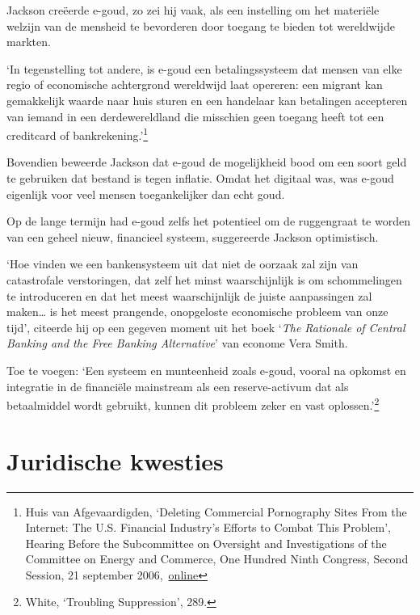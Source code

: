 \documentclass[
  a5paper,
  smalldemyvopaper,11pt,twoside,onecolumn,openright,extrafontsizes]{memoir}
\begin{document}
Jackson creëerde e-goud, zo zei hij vaak, als een instelling om het
materiële welzijn van de mensheid te bevorderen door toegang te bieden
tot wereldwijde markten.

`In tegenstelling tot andere, is e-goud een betalingssysteem dat mensen
van elke regio of economische achtergrond wereldwijd laat opereren: een
migrant kan gemakkelijk waarde naar huis sturen en een handelaar kan
betalingen accepteren van iemand in een derdewereldland die misschien
geen toegang heeft tot een creditcard of bankrekening.'\footnote{Huis
  van Afgevaardigden, `Deleting Commercial Pornography Sites From the
  Internet: The U.S. Financial Industry's Efforts to Combat This
  Problem', Hearing Before the Subcommittee on Oversight and
  Investigations of the Committee on Energy and Commerce, One Hundred
  Ninth Congress, Second Session, 21 september
  2006,~\href{https://www.govinfo.gov/content/pkg/CHRG-109hhrg31467/html/CHRG-109hhrg31467.htm}{online}}

Bovendien beweerde Jackson dat e-goud de mogelijkheid bood om een soort
geld te gebruiken dat bestand is tegen inflatie. Omdat het digitaal was,
was e-goud eigenlijk voor veel mensen toegankelijker dan echt goud.

Op de lange termijn had e-goud zelfs het potentieel om de ruggengraat te
worden van een geheel nieuw, financieel systeem, suggereerde Jackson
optimistisch.

`Hoe vinden we een bankensysteem uit dat niet de oorzaak zal zijn van
catastrofale verstoringen, dat zelf het minst waarschijnlijk is om
schommelingen te introduceren en dat het meest waarschijnlijk de juiste
aanpassingen zal maken\ldots{} is het meest prangende, onopgeloste
economische probleem van onze tijd', citeerde hij op een gegeven moment
uit het boek `\emph{The Rationale of Central Banking and the Free
Banking Alternative}' van econome Vera Smith.

Toe te voegen: `Een systeem en munteenheid zoals e-goud, vooral na
opkomst en integratie in de financiële mainstream als een
reserve-activum dat als betaalmiddel wordt gebruikt, kunnen dit probleem
zeker en vast oplossen.'\footnote{\hspace{0pt}White, `Troubling
  Suppression', 289.}

\section*{Juridische kwesties}\label{juridische-kwesties}
\end{document}
